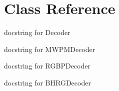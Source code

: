 \documentclass[letterpaper,10pt,english]{sphinxmanual}
\begin{document}
\section{Class Reference}
\label{decoder:class-reference}

\begin{fulllineitems}
\label{decoder:py_qcode.Decoder}
docstring for Decoder

\end{fulllineitems}


\begin{fulllineitems}
\label{decoder:py_qcode.MWPMDecoder}
docstring for MWPMDecoder

\end{fulllineitems}


\begin{fulllineitems}
\label{decoder:py_qcode.RGBPDecoder}
docstring for RGBPDecoder

\end{fulllineitems}


\begin{fulllineitems}
\label{decoder:py_qcode.BHRGDecoder}
docstring for BHRGDecoder

\end{fulllineitems}
\end{document}
